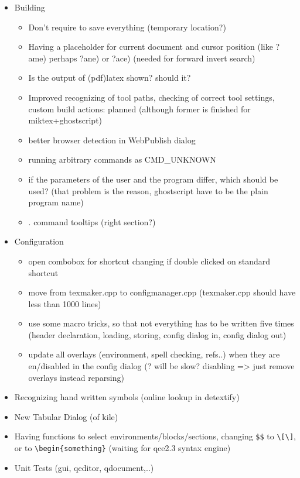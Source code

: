 \documentclass[10pt,a4paper,landscape]{report}
\begin{document}
\begin{itemize}
\begin{itemize}
		\item Respect \verb+\verb+ or even multiline \verb+\begin{verbatim}+
		\item Grammar Checker
		\item LaTeX Checker	(calling lacheck?)
	\end{itemize}
	\item Building \begin{itemize}
		\item Don't require to save everything (temporary location?)
		\item Having a placeholder for current document and cursor position (like ?ame) perhaps ?ane) or ?ace) (needed for forward invert search)
		\item Is the output of (pdf)latex shown? should it?
		\item Improved recognizing of tool paths, checking of correct tool settings,  custom build actions: planned (although former is finished for miktex+ghostscript)
		\item better browser detection in WebPublish dialog 
		\item running arbitrary commands as CMD_UNKNOWN
		\item if the parameters of the user and the program differ, which should be used? (that problem is the reason, ghostscript have to be the plain program name)
		\item . command tooltips (right section?)
	\end{itemize}
	\item Configuration \begin{itemize}
		\item open combobox for shortcut changing if double clicked on standard shortcut
		\item move from texmaker.cpp to configmanager.cpp (texmaker.cpp should have less than 1000 lines)
		\item use some macro tricks, so that not everything has to be written five times (header declaration, loading, storing, config dialog in, config dialog out)
		\item update all overlays (environment, spell checking, refs..) when they are en/disabled in the config dialog (? will be slow? disabling => just remove overlays instead reparsing)
	\end{itemize} 
	\item Recognizing hand written symbols (online lookup in detextify)
	\item New Tabular Dialog (of kile)
	\item Having functions to select environments/blocks/sections, changing \verb+$$+ to \verb+\[\]+, or to \verb+\begin{something}+ (waiting for qce2.3 syntax engine)
	\item Unit Tests (gui, qeditor, qdocument,..)
\end{itemize}
\end{document}
